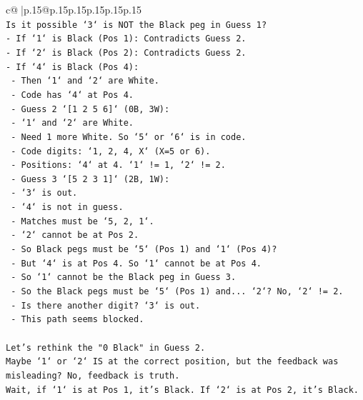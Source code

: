 \documentclass{article}
\begin{document}
{\begin{supertabular}{c@{$\;$}|p{.15\linewidth}@{}p{.15\linewidth}p{.15\linewidth}p{.15\linewidth}p{.15\linewidth}p{.15\linewidth}}
{{{\\ 
\texttt{Is it possible `3` is NOT the Black peg in Guess 1?} \\
\texttt{{-} If `1` is Black (Pos 1): Contradicts Guess 2.} \\
\texttt{{-} If `2` is Black (Pos 2): Contradicts Guess 2.} \\
\texttt{{-} If `4` is Black (Pos 4):} \\
\texttt{    {-} Then `1` and `2` are White.} \\
\texttt{    {-} Code has `4` at Pos 4.} \\
\texttt{    {-} Guess 2 `{[}1 2 5 6{]}` (0B, 3W):} \\
\texttt{        {-} `1` and `2` are White.} \\
\texttt{        {-} Need 1 more White. So `5` or `6` is in code.} \\
\texttt{        {-} Code digits: `1, 2, 4, X` (X=5 or 6).} \\
\texttt{        {-} Positions: `4` at 4. `1` != 1, `2` != 2.} \\
\texttt{        {-} Guess 3 `{[}5 2 3 1{]}` (2B, 1W):} \\
\texttt{            {-} `3` is out.} \\
\texttt{            {-} `4` is not in guess.} \\
\texttt{            {-} Matches must be `5, 2, 1`.} \\
\texttt{            {-} `2` cannot be at Pos 2.} \\
\texttt{            {-} So Black pegs must be `5` (Pos 1) and `1` (Pos 4)?} \\
\texttt{            {-} But `4` is at Pos 4. So `1` cannot be at Pos 4.} \\
\texttt{            {-} So `1` cannot be the Black peg in Guess 3.} \\
\texttt{            {-} So the Black pegs must be `5` (Pos 1) and... `2`? No, `2` != 2.} \\
\texttt{            {-} Is there another digit? `3` is out.} \\
\texttt{            {-} This path seems blocked.} \\
\\ 
\texttt{Let's rethink the "0 Black" in Guess 2.} \\
\texttt{Maybe `1` or `2` IS at the correct position, but the feedback was misleading? No, feedback is truth.} \\
\texttt{Wait, if `1` is at Pos 1, it's Black. If `2` is at Pos 2, it's Black.} \\
}}}
\end{supertabular}}
\end{document}
